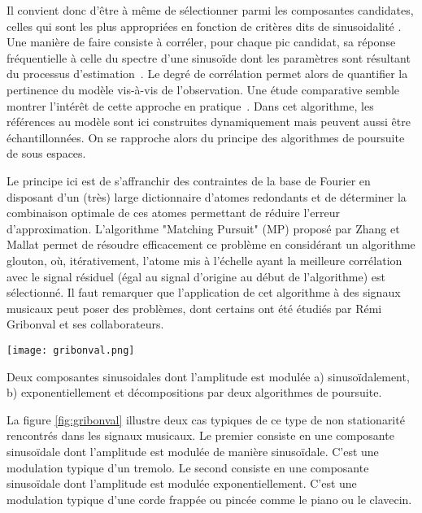 Il convient donc d'être à même de sélectionner parmi les composantes candidates, celles qui sont les plus appropriées en fonction de critères dits de \og sinusoidalité \fg. Une manière de faire consiste à corréler, pour chaque pic candidat, sa réponse fréquentielle à celle du spectre d'une sinusoïde dont les paramètres sont résultant du processus d'estimation~\cite{peak-selection}. Le degré de corrélation permet alors de quantifier la pertinence du modèle vis-à-vis de l'observation. Une étude comparative semble montrer l'intérêt de cette approche en pratique~\cite{wells2010comparative}. Dans cet algorithme, les références au modèle sont ici construites dynamiquement mais peuvent aussi être échantillonnées. On se rapproche alors du principe des algorithmes de poursuite de sous espaces.

Le principe ici est de s'affranchir des contraintes de la base de Fourier en disposant d'un (très) large dictionnaire d'atomes redondants et de déterminer la combinaison optimale de ces atomes permettant de réduire l'erreur d'approximation. L'algorithme "Matching Pursuit" (MP) proposé par Zhang et Mallat\cite{mallat1993matching} permet de résoudre efficacement ce problème en considérant un algorithme glouton, où, itérativement, l'atome mis à l'échelle ayant la meilleure corrélation avec le signal résiduel (égal au signal d'origine au début de l'algorithme) est sélectionné. Il faut remarquer que l'application de cet algorithme à des signaux musicaux peut poser des problèmes, dont certains ont été étudiés par Rémi Gribonval et ses collaborateurs\cite{gribonval1996sound}. %

\begin{marginfigure}
  \texttt{[image: gribonval.png]}
  \caption{Deux composantes sinusoidales dont l'amplitude est modulée a) sinusoïdalement, b) exponentiellement et décompositions par deux algorithmes de poursuite.}
  \label{fig:gribonval}
\end{marginfigure}

La figure \ref{fig:gribonval} illustre deux cas typiques de ce type de non stationarité rencontrés dans les signaux musicaux. Le premier consiste en une composante sinusoïdale dont l'amplitude est modulée de manière sinusoïdale. C'est une modulation typique d'un tremolo. Le second consiste en une composante sinusoïdale dont l'amplitude est modulée exponentiellement. C'est une modulation typique d'une corde frappée ou pincée comme le piano ou le clavecin.

